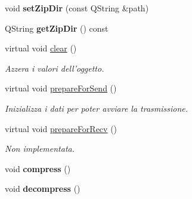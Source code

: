 \begin{DoxyCompactItemize}
\item 
\hypertarget{class_k_cloud_1_1_resource_aa3a48fa700a7ccdc191ed3f81abf5b79}{void {\bfseries set\-Zip\-Dir} (const Q\-String \&path)}\label{class_k_cloud_1_1_resource_aa3a48fa700a7ccdc191ed3f81abf5b79}

\item 
\hypertarget{class_k_cloud_1_1_resource_a57916e04bcb13b6ffec61160140c4dc3}{Q\-String {\bfseries get\-Zip\-Dir} () const }\label{class_k_cloud_1_1_resource_a57916e04bcb13b6ffec61160140c4dc3}

\item 
virtual void \hyperlink{class_k_cloud_1_1_resource_aa1f3747d1d39bff3f659d499f0a65c79}{clear} ()
\begin{DoxyCompactList}\small\item\em Azzera i valori dell'oggetto. \end{DoxyCompactList}\item 
virtual void \hyperlink{class_k_cloud_1_1_resource_a87f2ba117ca6054c29ce303628302f1b}{prepare\-For\-Send} ()
\begin{DoxyCompactList}\small\item\em Inizializza i dati per poter avviare la trasmissione. \end{DoxyCompactList}\item 
\hypertarget{class_k_cloud_1_1_resource_a72ef4c24346982bf78a8654f324064c0}{virtual void \hyperlink{class_k_cloud_1_1_resource_a72ef4c24346982bf78a8654f324064c0}{prepare\-For\-Recv} ()}\label{class_k_cloud_1_1_resource_a72ef4c24346982bf78a8654f324064c0}

\begin{DoxyCompactList}\small\item\em Non implementata. \end{DoxyCompactList}\item 
\hypertarget{class_k_cloud_1_1_resource_a03a50aa73def109914c497eff7776cdb}{void {\bfseries compress} ()}\label{class_k_cloud_1_1_resource_a03a50aa73def109914c497eff7776cdb}

\item 
\hypertarget{class_k_cloud_1_1_resource_a459ff08f0f8525d413fed943604774e3}{void {\bfseries decompress} ()}\label{class_k_cloud_1_1_resource_a459ff08f0f8525d413fed943604774e3}

\end{DoxyCompactItemize}
